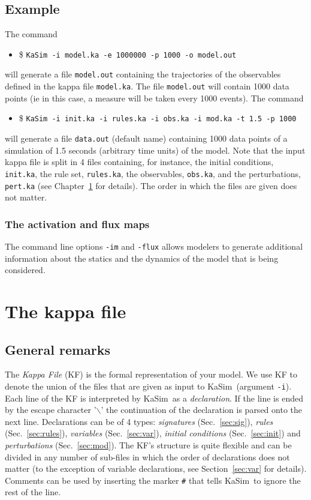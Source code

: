 \documentclass[11pt]{book}
\def\KaSim{\textsf{KaSim}}
\def\ttt#1{\texttt{#1}}
\def\bs{\backslash}
\def\ie{ie }
\def\ITE#1{\begin{itemize}#1\end{itemize}}
\begin{document}
\section*{Example}
The command 
\ITE{
\item[\$] \ttt{KaSim -i model.ka -e 1000000 -p 1000 -o model.out}  
}
will generate a file \ttt{model.out} containing the trajectories of the observables defined in the kappa file \ttt{model.ka}. The file \ttt{model.out} will contain 1000 data points (\ie in this case, a measure will be taken every 1000 events). The command
\ITE{
\item[\$] \ttt{KaSim -i init.ka -i rules.ka -i obs.ka -i mod.ka -t 1.5 -p 1000}  
}
will generate a file \ttt{data.out} (default name) containing 1000 data points of a simulation of 1.5 seconds (arbitrary time units) of the model. Note that the input kappa file is split in 4 files containing, for instance, the initial conditions, \ttt{init.ka}, the rule set, \ttt{rules.ka}, the observables, \ttt{obs.ka}, and the perturbations, \ttt{pert.ka} (see Chapter~\ref{chap:kappa} for details). The order in which the files are given does not matter.

\subsection{The activation and flux maps}

The command line options \ttt{-im} and \ttt{-flux} allows modelers to generate additional information about the statics and the dynamics of the model that is being considered.

\chapter{The kappa file}\label{chap:kappa}

\section{General remarks}
The \emph{Kappa File} (KF) is the formal representation of your model. We use KF to denote the union of the files that are given as input to \KaSim~(argument \ttt{-i}). Each line of the KF is interpreted by \KaSim~as a \emph{declaration}. If the line is ended by the escape character '\ttt{$\bs$}' the continuation of the declaration is parsed onto the next line. Declarations can be of 4 types: \emph{signatures} (Sec.~\ref{sec:sig}), \emph{rules} (Sec.~\ref{sec:rules}), \emph{variables} (Sec.~\ref{sec:var}), \emph{initial conditions} (Sec.~\ref{sec:init}) and \emph{perturbations} (Sec.~\ref{sec:mod}). The KF's structure is quite flexible and can be divided in any number of sub-files in which the order of declarations does not matter (to the exception of variable declarations, see Section~\ref{sec:var} for details). Comments can be used by inserting the marker \ttt{\#} that tells \KaSim~to ignore the rest of the line. 
\end{document}
